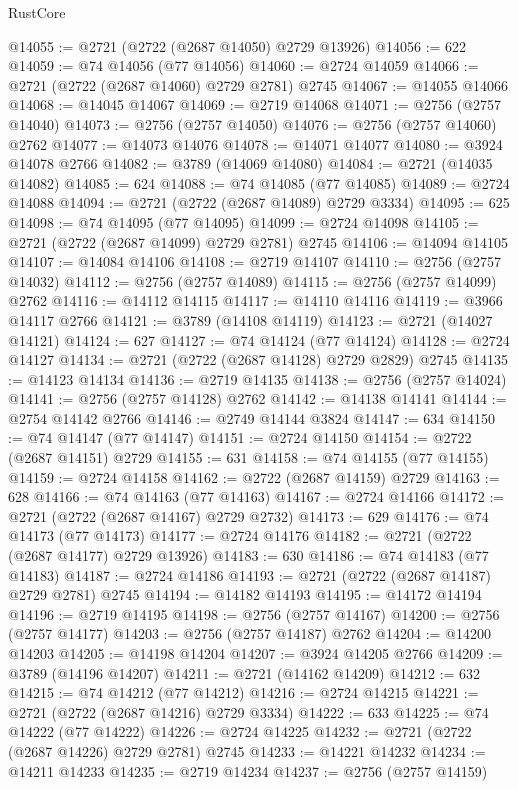 \begin{lexlean}{RustCore}
\begin{coremodule}
@14055 := @2721 (@2722 (@2687 @14050) @2729 @13926)
@14056 := 622
@14059 := @74 @14056 (@77 @14056)
@14060 := @2724 @14059
@14066 := @2721 (@2722 (@2687 @14060) @2729 @2781) @2745
@14067 := @14055 @14066
@14068 := @14045 @14067
@14069 := @2719 @14068
@14071 := @2756 (@2757 @14040)
@14073 := @2756 (@2757 @14050)
@14076 := @2756 (@2757 @14060) @2762
@14077 := @14073 @14076
@14078 := @14071 @14077
@14080 := @3924 @14078 @2766
@14082 := @3789 (@14069 @14080)
@14084 := @2721 (@14035 @14082)
@14085 := 624
@14088 := @74 @14085 (@77 @14085)
@14089 := @2724 @14088
@14094 := @2721 (@2722 (@2687 @14089) @2729 @3334)
@14095 := 625
@14098 := @74 @14095 (@77 @14095)
@14099 := @2724 @14098
@14105 := @2721 (@2722 (@2687 @14099) @2729 @2781) @2745
@14106 := @14094 @14105
@14107 := @14084 @14106
@14108 := @2719 @14107
@14110 := @2756 (@2757 @14032)
@14112 := @2756 (@2757 @14089)
@14115 := @2756 (@2757 @14099) @2762
@14116 := @14112 @14115
@14117 := @14110 @14116
@14119 := @3966 @14117 @2766
@14121 := @3789 (@14108 @14119)
@14123 := @2721 (@14027 @14121)
@14124 := 627
@14127 := @74 @14124 (@77 @14124)
@14128 := @2724 @14127
@14134 := @2721 (@2722 (@2687 @14128) @2729 @2829) @2745
@14135 := @14123 @14134
@14136 := @2719 @14135
@14138 := @2756 (@2757 @14024)
@14141 := @2756 (@2757 @14128) @2762
@14142 := @14138 @14141
@14144 := @2754 @14142 @2766
@14146 := @2749 @14144 @3824
@14147 := 634
@14150 := @74 @14147 (@77 @14147)
@14151 := @2724 @14150
@14154 := @2722 (@2687 @14151) @2729
@14155 := 631
@14158 := @74 @14155 (@77 @14155)
@14159 := @2724 @14158
@14162 := @2722 (@2687 @14159) @2729
@14163 := 628
@14166 := @74 @14163 (@77 @14163)
@14167 := @2724 @14166
@14172 := @2721 (@2722 (@2687 @14167) @2729 @2732)
@14173 := 629
@14176 := @74 @14173 (@77 @14173)
@14177 := @2724 @14176
@14182 := @2721 (@2722 (@2687 @14177) @2729 @13926)
@14183 := 630
@14186 := @74 @14183 (@77 @14183)
@14187 := @2724 @14186
@14193 := @2721 (@2722 (@2687 @14187) @2729 @2781) @2745
@14194 := @14182 @14193
@14195 := @14172 @14194
@14196 := @2719 @14195
@14198 := @2756 (@2757 @14167)
@14200 := @2756 (@2757 @14177)
@14203 := @2756 (@2757 @14187) @2762
@14204 := @14200 @14203
@14205 := @14198 @14204
@14207 := @3924 @14205 @2766
@14209 := @3789 (@14196 @14207)
@14211 := @2721 (@14162 @14209)
@14212 := 632
@14215 := @74 @14212 (@77 @14212)
@14216 := @2724 @14215
@14221 := @2721 (@2722 (@2687 @14216) @2729 @3334)
@14222 := 633
@14225 := @74 @14222 (@77 @14222)
@14226 := @2724 @14225
@14232 := @2721 (@2722 (@2687 @14226) @2729 @2781) @2745
@14233 := @14221 @14232
@14234 := @14211 @14233
@14235 := @2719 @14234
@14237 := @2756 (@2757 @14159)

\end{coremodule}
\end{lexlean}
